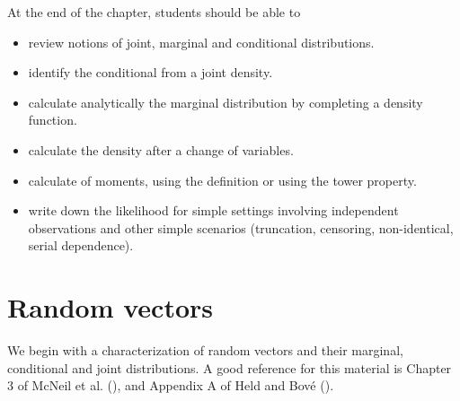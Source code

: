 \documentclass[
  11pt,
  letterpaper,
]{scrbook}
\providecommand{\tightlist}{%
  \setlength{\itemsep}{0pt}\setlength{\parskip}{0pt}}
\theoremstyle{definition}
\theoremstyle{plain}
\theoremstyle{plain}
\theoremstyle{plain}
\theoremstyle{definition}
\theoremstyle{definition}
\theoremstyle{plain}
\theoremstyle{plain}
\theoremstyle{remark}
\begin{document}
\begin{tcolorbox}[enhanced jigsaw, arc=.35mm, bottomrule=.15mm, bottomtitle=1mm, breakable, colback=white, colbacktitle=quarto-callout-important-color!10!white, colframe=quarto-callout-important-color-frame, coltitle=black, left=2mm, leftrule=.75mm, opacityback=0, opacitybacktitle=0.6, rightrule=.15mm, title=\textcolor{quarto-callout-important-color}{\faExclamation}\hspace{0.5em}{\textbf{Learning objectives}:}, titlerule=0mm, toprule=.15mm, toptitle=1mm]

At the end of the chapter, students should be able to

\begin{itemize}
\tightlist
\item
  review notions of joint, marginal and conditional distributions.
\item
  identify the conditional from a joint density.
\item
  calculate analytically the marginal distribution by completing a
  density function.
\item
  calculate the density after a change of variables.
\item
  calculate of moments, using the definition or using the tower
  property.
\item
  write down the likelihood for simple settings involving independent
  observations and other simple scenarios (truncation, censoring,
  non-identical, serial dependence).
\end{itemize}

\end{tcolorbox}

\section{Random vectors}\label{random-vectors}

We begin with a characterization of random vectors and their marginal,
conditional and joint distributions. A good reference for this material
is Chapter 3 of McNeil et al.
(), and Appendix A of
Held and Bové ().
\end{document}
